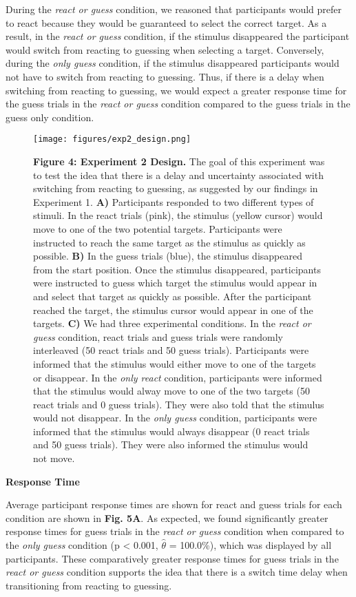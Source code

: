 \documentclass[12pt]{article}
\newcommand\boldblue[1]{\textcolor{mydarkblue}{\textbf{#1}}}
\begin{document}
During the \emph{react or guess} condition, we reasoned that participants would prefer to react because they would be guaranteed to select the correct target. As a result, in the \emph{react or guess} condition, if the stimulus disappeared the participant would switch from reacting to guessing when selecting a target. Conversely, during the \emph{only guess} condition, if the stimulus disappeared participants would not have to switch from reacting to guessing. Thus, if there is a delay when switching from reacting to guessing, we would expect a greater response time for the guess trials in the \emph{react or guess} condition compared to the guess trials in the guess only condition.
\begin{figure}[H]
  \centering
  \texttt{[image: figures/exp2\_design.png]}

  \caption*{\boldblue{Figure 4: Experiment 2 Design.} The goal of this experiment was to test the idea that there is a delay and uncertainty associated with switching from reacting to guessing, as suggested by our findings in  Experiment 1. \boldblue{A)} Participants responded to two different types of stimuli. In the react trials (pink), the stimulus (yellow cursor) would move to one of the two potential targets. Participants were instructed to reach the same target as the stimulus as quickly as possible. \boldblue{B)} In the guess trials (blue), the stimulus disappeared from the start position. Once the stimulus disappeared, participants were instructed to guess which target the stimulus would appear in and select that target as quickly as possible. After the participant reached the target, the stimulus cursor would appear in one of the targets. \boldblue{C)} We had three experimental conditions. In the \emph{react or guess} condition, react trials and guess trials were randomly interleaved (50 react trials and 50 guess trials). Participants were informed that the stimulus would either move to one of the targets or disappear. In the \emph{only react} condition, participants were informed that the stimulus would alway move to one of the two targets (50 react trials and 0 guess trials). They were also told that the stimulus would not disappear. In the \emph{only guess} condition, participants were informed that the stimulus would always disappear (0 react trials and 50 guess trials). They were also informed the stimulus would not move. }
\end{figure}
\noindent \boldblue{Response Time} 

\noindent Average participant response times are shown for react and guess trials for each condition are shown in \boldblue{Fig. 5A}. As expected, we found significantly greater response times for guess trials in the \emph{react or guess} condition when compared to the \emph{only guess} condition (p < 0.001, $\hat{\theta}$ = 100.0\%), which was displayed by all participants. These comparatively greater response times for guess trials in the \emph{react or guess} condition supports the idea that there is a switch time delay when transitioning from reacting to guessing.
\end{document}
